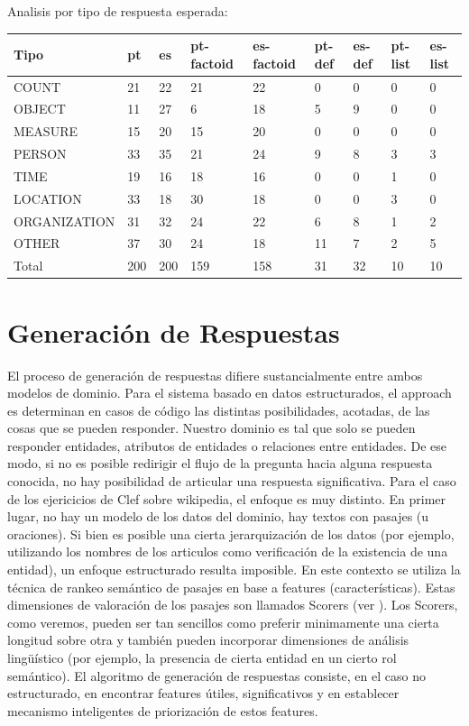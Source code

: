 Analisis por tipo de respuesta esperada:
\begin{center}
\begin{tabular}{| l | l | l | l | l | l |l |l|l|}
\hline
Tipo & pt & es & pt-factoid & es-factoid & pt-def & es-def & pt-list & es-list \\ \hline
COUNT & 21 & 22 & 21 & 22 & 0 & 0 & 0  & 0\\ \hline
OBJECT & 11 & 27 & 6  & 18 & 5 & 9 & 0  & 0\\ \hline
MEASURE & 15 & 20 & 15 & 20 & 0 & 0 & 0  & 0\\ \hline
PERSON & 33  & 35 & 21 & 24 & 9 & 8 & 3 & 3\\ \hline
TIME & 19 & 16 & 18 & 16 & 0 & 0 & 1 & 0\\ \hline
LOCATION & 33 & 18  & 30 & 18 & 0 & 0 & 3 & 0 \\ \hline
ORGANIZATION & 31 & 32 & 24 & 22 & 6 & 8 & 1 & 2\\ \hline
OTHER & 37 & 30 & 24 & 18 & 11 & 7 & 2 & 5 \\ \hline
Total & 200 & 200 & 159 & 158 & 31 & 32  & 10 & 10\\ \hline
\end{tabular}
\end{center}


\section{Generación de Respuestas}

El proceso de generación de respuestas difiere sustancialmente entre ambos modelos de dominio. Para el sistema basado en datos estructurados, el approach es determinan en casos de código las distintas posibilidades, acotadas, de las cosas que se pueden responder. Nuestro dominio es tal que solo se pueden responder entidades, atributos de entidades o relaciones entre entidades. De ese modo, si no es posible redirigir el flujo de la pregunta hacia alguna respuesta conocida, no hay posibilidad de articular una respuesta significativa. Para el caso de los ejericicios de Clef sobre wikipedia, el enfoque es muy distinto. En primer lugar, no hay un modelo de los datos del dominio, hay textos con pasajes (u oraciones). Si bien es posible una cierta jerarquización de los datos (por ejemplo, utilizando los nombres de los articulos como verificación de la existencia de una entidad), un enfoque estructurado resulta imposible. En este contexto se utiliza la técnica de rankeo semántico de pasajes en base a features (características). Estas dimensiones de valoración de los pasajes son llamados Scorers (ver ). Los Scorers, como veremos, pueden ser tan sencillos como preferir minimamente una cierta longitud sobre otra y también pueden incorporar dimensiones de análisis lingüístico (por ejemplo, la presencia de cierta entidad en un cierto rol semántico). El algoritmo de generación de respuestas consiste, en el caso no estructurado, en encontrar features útiles, significativos y en establecer mecanismo inteligentes de priorización de estos features. 

